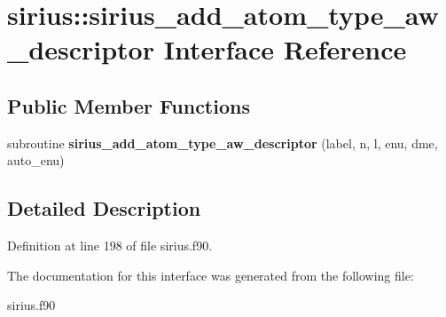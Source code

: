 \hypertarget{interfacesirius_1_1sirius__add__atom__type__aw__descriptor}{}\section{sirius\+:\+:sirius\+\_\+add\+\_\+atom\+\_\+type\+\_\+aw\+\_\+descriptor Interface Reference}
\label{interfacesirius_1_1sirius__add__atom__type__aw__descriptor}
\subsection*{Public Member Functions}
\begin{DoxyCompactItemize}
\item 
\hypertarget{interfacesirius_1_1sirius__add__atom__type__aw__descriptor_a6362dacc28de3b4bc50b2262ecbead85}{}subroutine {\bfseries sirius\+\_\+add\+\_\+atom\+\_\+type\+\_\+aw\+\_\+descriptor} (label, n, l, enu, dme, auto\+\_\+enu)\label{interfacesirius_1_1sirius__add__atom__type__aw__descriptor_a6362dacc28de3b4bc50b2262ecbead85}

\end{DoxyCompactItemize}


\subsection{Detailed Description}


Definition at line 198 of file sirius.\+f90.



The documentation for this interface was generated from the following file\+:\begin{DoxyCompactItemize}
\item 
sirius.\+f90\end{DoxyCompactItemize}
